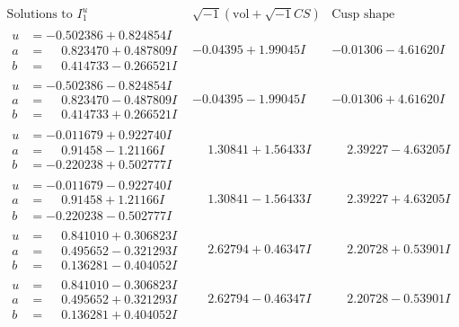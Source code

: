 \documentclass[1p]{elsarticle_modified}
\theoremstyle{definition}
\newcommand{\I}{\sqrt{-1}}
\begin{document}
$$\begin{array}{c|c|c}  
\text{Solutions to }I^u_{1}& \I (\text{vol} + \sqrt{-1}CS) & \text{Cusp shape}\\
 \hline 
\begin{aligned}
u &= -0.502386 + 0.824854 I \\
a &= \phantom{-}0.823470 + 0.487809 I \\
b &= \phantom{-}0.414733 - 0.266521 I\end{aligned}
 & -0.04395 + 1.99045 I & -0.01306 - 4.61620 I \\ \hline\begin{aligned}
u &= -0.502386 - 0.824854 I \\
a &= \phantom{-}0.823470 - 0.487809 I \\
b &= \phantom{-}0.414733 + 0.266521 I\end{aligned}
 & -0.04395 - 1.99045 I & -0.01306 + 4.61620 I \\ \hline\begin{aligned}
u &= -0.011679 + 0.922740 I \\
a &= \phantom{-}0.91458 - 1.21166 I \\
b &= -0.220238 + 0.502777 I\end{aligned}
 & \phantom{-}1.30841 + 1.56433 I & \phantom{-}2.39227 - 4.63205 I \\ \hline\begin{aligned}
u &= -0.011679 - 0.922740 I \\
a &= \phantom{-}0.91458 + 1.21166 I \\
b &= -0.220238 - 0.502777 I\end{aligned}
 & \phantom{-}1.30841 - 1.56433 I & \phantom{-}2.39227 + 4.63205 I \\ \hline\begin{aligned}
u &= \phantom{-}0.841010 + 0.306823 I \\
a &= \phantom{-}0.495652 - 0.321293 I \\
b &= \phantom{-}0.136281 - 0.404052 I\end{aligned}
 & \phantom{-}2.62794 + 0.46347 I & \phantom{-}2.20728 + 0.53901 I \\ \hline\begin{aligned}
u &= \phantom{-}0.841010 - 0.306823 I \\
a &= \phantom{-}0.495652 + 0.321293 I \\
b &= \phantom{-}0.136281 + 0.404052 I\end{aligned}
 & \phantom{-}2.62794 - 0.46347 I & \phantom{-}2.20728 - 0.53901 I \\ \hline\begin{aligned}

\end{aligned}
\end{array}$$
\end{document}
